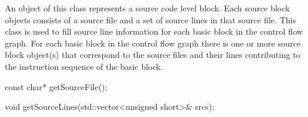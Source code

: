 
An object of this class represents a source code level block. Each
source block objects consists of a source file and a
set of source lines in that source file. This class is used to fill
source line information for each basic block in the
control flow graph. For each basic block in the control flow graph
there is one or more source block object(s) that
correspond to the source files and their lines contributing to the
instruction sequence of the basic block.

\begin{apient}
  const char* getSourceFile();
\end{apient}


\begin{apient}
  void getSourceLines(std::vector<unsigned short>& srcs);
\end{apient}

